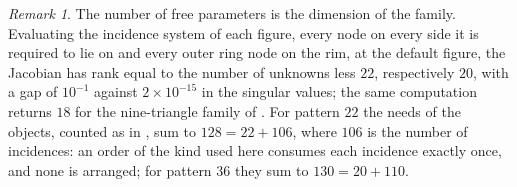 \documentclass[11pt,a4paper]{article}
\theoremstyle{definition}
\theoremstyle{remark}
\newtheorem{remark}[theorem]{Remark}
\begin{document}
\begin{remark}
The number of free parameters is the dimension of the family. Evaluating the incidence system of each
figure, every node on every side it is required to lie on and every outer ring node on the rim, at the
default figure, the Jacobian has rank equal to the number of unknowns less $22$, respectively $20$, with a
gap of $10^{-1}$ against $2\times10^{-15}$ in the singular values; the same computation returns $18$ for the
nine-triangle family of \cite{CK}. For pattern $22$ the needs of the objects, counted as in \cite[\S7.1]{CK}, sum to $128 = 22 + 106$, where
$106$ is the number of incidences: an order of the kind used here consumes each incidence exactly once, and
none is arranged; for pattern $36$ they sum to $130 = 20 + 110$.
\end{remark}

\end{document}
